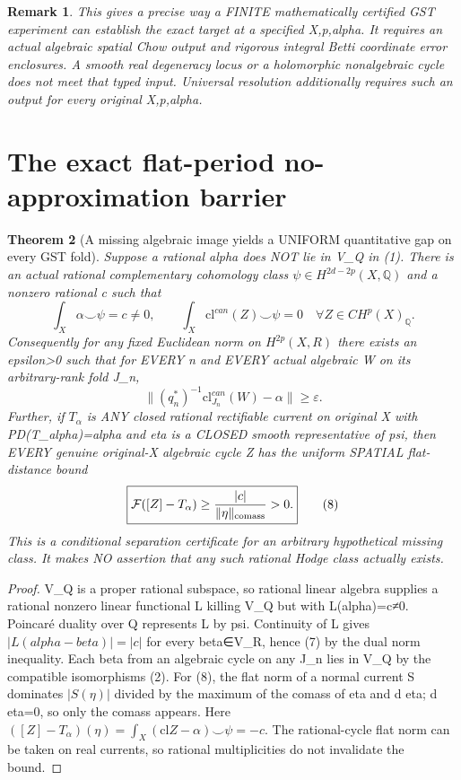 \documentclass[11pt]{article}
\newtheorem{theorem}{Theorem}[section]
\newtheorem{remark}[theorem]{Remark}
\begin{document}
\begin{remark}
This gives a precise way a FINITE mathematically certified GST
experiment can establish the exact target at a specified X,p,alpha.
It requires an actual algebraic spatial Chow output and rigorous
integral Betti coordinate error enclosures. A smooth real
degeneracy locus or a holomorphic nonalgebraic cycle does not
meet that typed input. Universal resolution additionally
requires such an output for every original X,p,alpha.
\end{remark}

\section{The exact flat-period no-approximation barrier}
\begin{theorem}[A missing algebraic image yields a UNIFORM quantitative gap on every GST fold]
Suppose a rational alpha
does NOT lie in V_Q in (1).
There is an actual rational
complementary cohomology
class $\psi\in H^{2d-2p}(X,\mathbb Q)$
and a nonzero rational c such that
\[
 \boxed{
 \int_X\alpha\smile\psi=c\ne0,
 \qquad
 \int_X\mathrm{cl}^{can}(Z)\smile\psi=0
   \quad\forall Z\in CH^p(X)_\mathbb Q.
 }                                                     \tag{6}
\]
Consequently for any fixed
Euclidean norm on
$H^{2p}(X,R)$ there exists
an epsilon>0 such that
for EVERY n and
EVERY actual algebraic W
on its arbitrary-rank
fold J_n,
\[
 \boxed{
 \big\|(q_n^*)^{-1}
      \mathrm{cl}^{can}_{J_n}(W)
        -\alpha\big\|\ge\varepsilon.
 }                                                     \tag{7}
\]
Further, if $T_\alpha$ is
ANY closed rational rectifiable
current on original X with
PD(T_alpha)=alpha and eta
is a CLOSED smooth representative
of psi, then EVERY genuine
original-X algebraic cycle Z
has the uniform SPATIAL
flat-distance bound
\[
 \boxed{
  {\cal F}([Z]-T_\alpha)
     \ge {|c|\over
                  \|\eta\|_{\mathrm{comass}}}>0 .
 }                                                     \tag{8}
\]
This is a conditional
separation certificate for
an arbitrary hypothetical
missing class. It makes
NO assertion that any such
rational Hodge class actually
exists.
\end{theorem}
\begin{proof}
V_Q is a proper rational
subspace, so rational
linear algebra supplies
a rational nonzero linear
functional L killing V_Q
but with L(alpha)=c≠0.
Poincaré duality over Q
represents L by psi.
Continuity of L gives
$|L(alpha-beta)|=|c|$
for every beta∈V_R,
hence (7) by the
dual norm inequality.
Each beta from an algebraic
cycle on any J_n lies in
V_Q by the compatible
isomorphisms (2).
For (8), the flat norm
of a normal current S
dominates $|S(\eta)|$
divided by the maximum
of the comass of eta
and d eta; d eta=0,
so only the comass
appears. Here
$([Z]-T_\alpha)(\eta)
=\int_X(\mathrm{cl}Z-\alpha)
          \smile\psi=-c$.
The rational-cycle
flat norm can be taken
on real currents,
so rational
multiplicities do not
invalidate the bound.
\end{proof}
\end{document}
